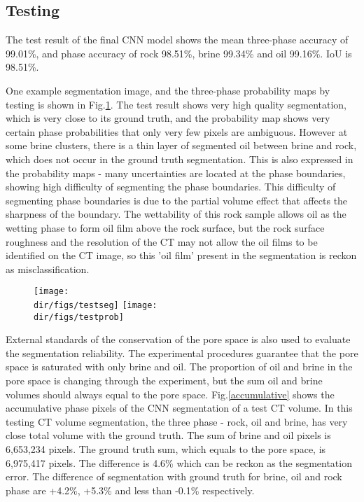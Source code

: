 \subsection{Testing}
The test result of the final CNN model shows the mean three-phase accuracy of 99.01\%, and phase accuracy of rock 98.51\%, brine 99.34\% and oil 99.16\%. IoU is 98.51\%. 

One example segmentation image, and the three-phase probability maps by testing is shown in Fig.\ref{testsegprob}. The test result shows very high quality segmentation, which is very close to its ground truth, and the probability map shows very certain phase probabilities that only very few pixels are ambiguous. However at some brine clusters, there is a thin layer of segmented oil between brine and rock, which does not occur in the ground truth segmentation. This is also expressed in the probability maps - many uncertainties are located at the phase boundaries, showing high difficulty of segmenting the phase boundaries. This difficulty of segmenting phase boundaries is due to the partial volume effect that affects the sharpness of the boundary. The wettability of this rock sample allows oil as the wetting phase to form oil film above the rock surface, but the rock surface roughness and the resolution of the CT may not allow the oil films to be identified on the CT image, so this 'oil film' present in the segmentation is reckon as misclassification.

\begin{figure}[htbp]
  \centering
  \texttt{[image: \\dir/figs/testseg]}
  \texttt{[image: \\dir/figs/testprob]}
  \caption{}
  \label{testsegprob}
\end{figure}

External standards of the conservation of the pore space is also used to evaluate the segmentation reliability. The experimental procedures guarantee that the pore space is saturated with only brine and oil. The proportion of oil and brine in the pore space is changing through the experiment, but the sum oil and brine volumes should always equal to the pore space. Fig.\ref{accumulative} shows the accumulative phase pixels of the CNN segmentation of a test CT volume. In this testing CT volume segmentation, the three phase - rock, oil and brine, has very close total volume with the ground truth. The sum of brine and oil pixels is 6,653,234 pixels. The ground truth sum, which equals to the pore space, is 6,975,417 pixels. The difference is 4.6\% which can be reckon as the segmentation error. The difference of segmentation with ground truth for brine, oil and rock phase are +4.2\%, +5.3\% and less than -0.1\% respectively. 


